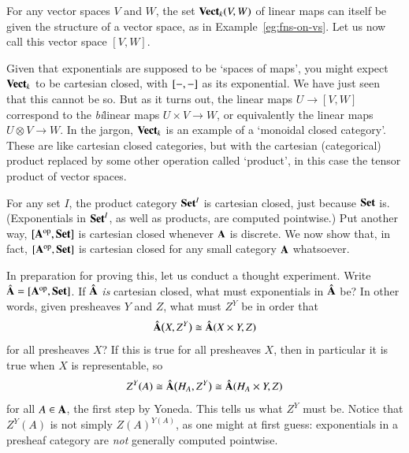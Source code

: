 \begin{remark}
For any vector spaces $V$ and $W$, the set $\mathbf{Vect}_k(V, W)$ of linear maps
can itself be given the structure of a vector space, as in
Example~\ref{eg:fns-on-vs}.  Let us now call this vector space $[V, W]$.

Given that exponentials are supposed to be `spaces of maps', you might
expect $\mathbf{Vect}_k$ to be cartesian closed, with $[-, -]$ as its
exponential.  We have just seen that this cannot be so.  But as it turns
out, the linear maps $U \to [V, W]$ correspond to the \emph{bi}linear%
%
%
maps $U \times V \to W$, or equivalently the linear maps $U \otimes V \to
W$.%
%
%
In the jargon, $\mathbf{Vect}_k$ is an example of a `monoidal%
%
%
%
closed category'.  These are like cartesian closed categories, but with the
cartesian (categorical) product replaced by some other operation called
`product', in this case the tensor product of vector spaces.
\end{remark}

For any set $I$, the product category $\mathbf{Set}^I$ is cartesian closed, just
because $\mathbf{Set}$ is.  (Exponentials in $\mathbf{Set}^I$, as well as products, are
computed pointwise.)  Put another way, $[\mathbf{A}^{\mathrm{op}},\mathbf{Set}]$ is cartesian
closed whenever $\mathbf{A}$ is discrete.  We now show that, in fact,
$[\mathbf{A}^{\mathrm{op}},\mathbf{Set}]$ is cartesian closed for any small category $\mathbf{A}$
whatsoever.

In preparation for proving this, let us conduct a thought%
%
%
experiment.  Write $\psh{\scat{A}}%
%
\ntn{psh}
%
 = \pshf{\scat{A}}$.  If $\hat{\mathbf{A}}$ \emph{is} cartesian
closed, what must exponentials in $\hat{\mathbf{A}}$ be?  In other words, given
presheaves $Y$ and $Z$, what must $Z^Y$ be in order that
%
\begin{equation}
\label{eq:cc-pshf}
\hat{\mathbf{A}}\bigl(X, Z^Y\bigr)
\cong
\hat{\mathbf{A}}(X \times Y, Z)
\end{equation}
%
for all presheaves $X$?  If this is true for all presheaves $X$, then in
particular it is true when $X$ is representable, so
\[
Z^Y(A)
\cong
\hat{\mathbf{A}}\bigl(H_A, Z^Y\bigr)
\cong
\hat{\mathbf{A}}(H_A \times Y, Z)
\]
for all $A \in \mathbf{A}$, the first step by Yoneda.  This tells us what
$Z^Y$ must be.  Notice that $Z^Y(A)$ is not simply $Z(A)^{Y(A)}$, as one
might at first guess: exponentials in a presheaf category are \emph{not}
generally computed pointwise.%
%
%


